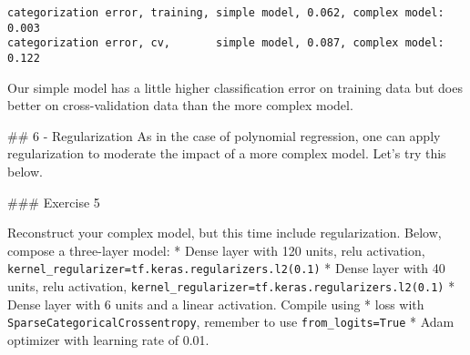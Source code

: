 \documentclass[11pt]{article}
\begin{document}
    \begin{Verbatim}[commandchars=\\\{\}]
categorization error, training, simple model, 0.062, complex model: 0.003
categorization error, cv,       simple model, 0.087, complex model: 0.122
    \end{Verbatim}

    Our simple model has a little higher classification error on training
data but does better on cross-validation data than the more complex
model.

    \#\# 6 - Regularization As in the case of polynomial regression, one can
apply regularization to moderate the impact of a more complex model.
Let's try this below.

\#\#\# Exercise 5

Reconstruct your complex model, but this time include regularization.
Below, compose a three-layer model: * Dense layer with 120 units, relu
activation, \texttt{kernel\_regularizer=tf.keras.regularizers.l2(0.1)} *
Dense layer with 40 units, relu activation,
\texttt{kernel\_regularizer=tf.keras.regularizers.l2(0.1)} * Dense layer
with 6 units and a linear activation. Compile using * loss with
\texttt{SparseCategoricalCrossentropy}, remember to use
\texttt{from\_logits=True} * Adam optimizer with learning rate of 0.01.
\end{document}
